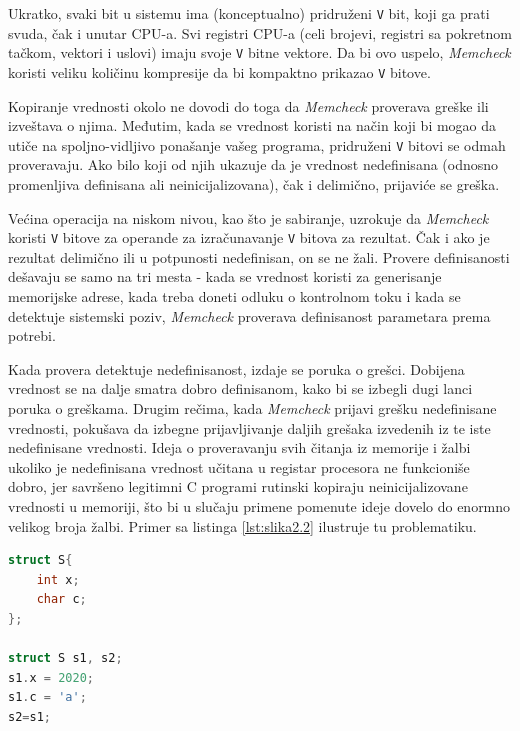 \documentclass[12pt,oneside]{memoir}
\theoremstyle{plain}
\theoremstyle{definition}
\begin{document}
Ukratko, svaki bit u sistemu ima (konceptualno) pridruženi \texttt{V} bit, koji ga prati svuda, čak i unutar CPU-a. Svi registri CPU-a (celi brojevi, registri sa pokretnom tačkom, vektori i uslovi) imaju svoje \texttt{V} bitne vektore. Da bi ovo uspelo, \textit{Memcheck} koristi veliku količinu kompresije da bi kompaktno prikazao \texttt{V} bitove.

Kopiranje vrednosti okolo ne dovodi do toga da \textit{Memcheck} proverava greške ili izveštava o njima. Međutim, kada se vrednost koristi na način koji bi mogao da utiče na spoljno-vidljivo ponašanje vašeg programa, pridruženi \texttt{V} bitovi se odmah proveravaju. Ako bilo koji od njih ukazuje da je vrednost nedefinisana (odnosno promenljiva definisana ali neinicijalizovana), čak i delimično, prijaviće se greška.

Većina operacija na niskom nivou, kao što je sabiranje, uzrokuje da \textit{Memcheck} koristi \texttt{V} bitove za operande za izračunavanje \texttt{V} bitova za rezultat. Čak i ako je rezultat delimično ili u potpunosti nedefinisan, on se ne žali. Provere definisanosti dešavaju se samo na tri mesta -  kada se vrednost koristi za generisanje memorijske adrese, kada treba doneti odluku o kontrolnom toku i kada se detektuje sistemski poziv, \textit{Memcheck} proverava definisanost parametara prema potrebi.

Kada provera detektuje nedefinisanost, izdaje se poruka o grešci. Dobijena vrednost se na dalje smatra dobro definisanom, kako bi se izbegli dugi lanci poruka o greškama. Drugim rečima, kada \textit{Memcheck} prijavi grešku nedefinisane vrednosti, pokušava da izbegne prijavljivanje daljih grešaka izvedenih iz te iste nedefinisane vrednosti. Ideja o proveravanju svih čitanja iz memorije i žalbi ukoliko je nedefinisana vrednost učitana u registar procesora ne funkcioniše dobro, jer savršeno legitimni C programi rutinski kopiraju neinicijalizovane vrednosti u memoriji, što bi u slučaju primene pomenute ideje dovelo do enormno velikog broja žalbi. Primer sa listinga \ref{lst:slika2.2} ilustruje tu problematiku.

\begin{lstlisting}[style=mystyle,caption={Primer kratkog segmenta koda}, label={lst:slika2.2},language={C}] 
struct S{
	int x;
	char c;
};

struct S s1, s2;
s1.x = 2020;
s1.c = 'a';
s2=s1;
\end{lstlisting}

\end{document}
